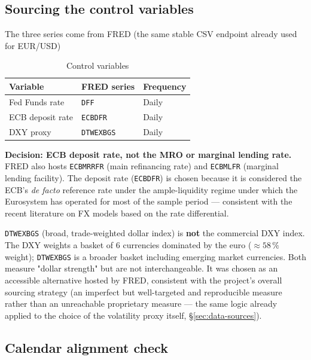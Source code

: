 \documentclass[12pt,a4paper]{article}
\begin{document}
\subsection{Sourcing the control variables}

The three series come from FRED (the same stable CSV
endpoint already used for EUR/USD)
\begin{table}[H]
	\centering
	\caption{Control variables}
	\begin{tabular}{lll}
		\toprule
		Variable & FRED series & Frequency \\
		\midrule
		Fed Funds rate & \texttt{DFF} & Daily \\
		ECB deposit rate & \texttt{ECBDFR} & Daily \\
		DXY proxy & \texttt{DTWEXBGS} & Daily \\
		\bottomrule
	\end{tabular}
\end{table}

\textbf{Decision: ECB deposit rate, not the MRO or marginal
	lending rate.} FRED also hosts \texttt{ECBMRRFR} (main refinancing
rate) and \texttt{ECBMLFR} (marginal lending facility). The deposit
rate (\texttt{ECBDFR}) is chosen because it is considered the ECB's
\emph{de facto} reference rate under the ample-liquidity
regime under which the Eurosystem has operated for most of
the sample period --- consistent with the recent literature on
FX models based on the rate differential.

\vspace{0.3cm}

\begin{limitbox}
	\texttt{DTWEXBGS} (broad, trade-weighted dollar index)
	is \textbf{not} the commercial DXY index. The DXY weights a basket
	of 6 currencies dominated by the euro ($\approx 58\,\%$ weight);
	\texttt{DTWEXBGS} is a broader basket including emerging
	market currencies. Both measure "dollar strength"
	but are not interchangeable. It was chosen as an accessible
	alternative hosted by FRED, consistent with the project's overall
	sourcing strategy (an imperfect but well-targeted and
	reproducible measure rather than an unreachable proprietary measure ---
	the same logic already applied to the choice of the volatility proxy itself,
	\S\ref{sec:data-sources}).
\end{limitbox}

\subsection{Calendar alignment check}
\end{document}
